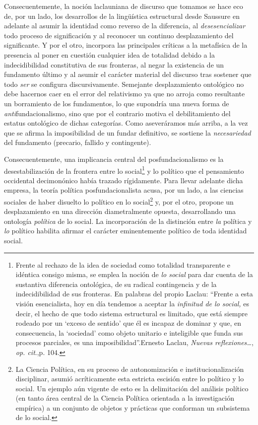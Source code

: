 Consecuentemente, la noción laclauniana de discurso que tomamos se hace eco de, por un lado, los desarrollos de la lingüística estructural desde Saussure en adelante al asumir la identidad como reverso de la diferencia, al \emph{desesencializar} todo proceso de significación y al reconocer un continuo desplazamiento del significante. Y por el otro, incorpora las principales críticas a la metafísica de la presencia al poner en cuestión cualquier idea de totalidad debido a la indecidibilidad constitutiva de sus fronteras, al negar la existencia de un fundamento último y al asumir el carácter material del discurso tras sostener que todo \emph{ser} se configura discursivamente. Semejante desplazamiento ontológico no debe hacernos caer en el error del relativismo ya que no arroja como resultante un borramiento de los fundamentos, lo que supondría una nueva forma de \emph{anti}fundacionalismo, sino que por el contrario motiva el debilitamiento del estatus ontológico de dichas categorías. Como aseveráramos más arriba, a la vez que se afirma la imposibilidad de un fundar definitivo, se sostiene la \emph{necesariedad} del fundamento (precario, fallido y contingente).

Consecuentemente, una implicancia central del posfundacionalismo es la desestabilización de la frontera entre lo social\footnote{Frente al rechazo de la idea de sociedad como totalidad transparente e idéntica consigo misma, se emplea la noción de \emph{lo social} para dar cuenta de la sustantiva diferencia ontológica, de su radical contingencia y de la indecidibilidad de sus fronteras. En palabras del propio Laclau: \enquote{Frente a esta visión esencialista, hoy en día tendemos a aceptar la \emph{infinitud de lo social,} es decir, el hecho de que todo sistema estructural es limitado, que está siempre rodeado por un \enquote{exceso de sentido} que él es incapaz de dominar y que, en consecuencia, la \enquote{sociedad} como objeto unitario e inteligible que funda sus procesos parciales, es una imposibilidad}.Ernesto Laclau, \emph{Nuevas reflexiones\ldots{}}, \emph{op. cit}.,p. 104.} y lo político que el pensamiento occidental decimonónico había trazado rígidamente. Para llevar adelante dicha empresa, la teoría política posfundacionalista acusa, por un lado, a las ciencias sociales de haber disuelto lo político en lo social\footnote{La Ciencia Política, en su proceso de autonomización e institucionalización disciplinar, asumió acríticamente esta estricta escisión entre lo político y lo social. Un ejemplo aún vigente de esto es la delimitación del análisis político (en tanto área central de la Ciencia Política orientada a la investigación empírica) a un conjunto de objetos y prácticas que conforman un subsistema de lo social.} y, por el otro, propone un desplazamiento en una dirección diametralmente opuesta, desarrollando una ontología \emph{política} de lo social. La incorporación de la distinción entre \emph{la} política y \emph{lo} político  habilita afirmar el carácter eminentemente político de toda identidad social.

